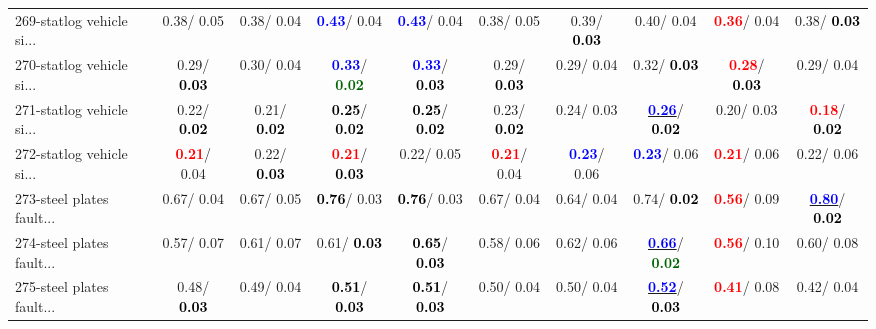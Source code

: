 \begin{table}[h]
\begin{center}
{\begin{tabular}{lc|c|c|c|c|c|c|c|c}
269-statlog vehicle si... &   0.38/  0.05 &   0.38/  0.04 & \textcolor{blue}{\textbf{  0.43}}/  0.04 & \textcolor{blue}{\textbf{  0.43}}/  0.04 &   0.38/  0.05 &   0.39/\textcolor{black}{\textbf{  0.03}} &   0.40/  0.04 & \textcolor{red}{\textbf{  0.36}}/  0.04 &   0.38/\textcolor{black}{\textbf{  0.03}} \\
270-statlog vehicle si... &   0.29/\textcolor{black}{\textbf{  0.03}} &   0.30/  0.04 & \textcolor{blue}{\textbf{  0.33}}/\textcolor{darkgreen}{\textbf{  0.02}} & \textcolor{blue}{\textbf{  0.33}}/\textcolor{black}{\textbf{  0.03}} &   0.29/\textcolor{black}{\textbf{  0.03}} &   0.29/  0.04 &   0.32/\textcolor{black}{\textbf{  0.03}} & \textcolor{red}{\textbf{  0.28}}/\textcolor{black}{\textbf{  0.03}} &   0.29/  0.04 \\ \hline
271-statlog vehicle si... &   0.22/\textcolor{black}{\textbf{  0.02}} &   0.21/\textcolor{black}{\textbf{  0.02}} & \textcolor{black}{\textbf{  0.25}}/\textcolor{black}{\textbf{  0.02}} & \textcolor{black}{\textbf{  0.25}}/\textcolor{black}{\textbf{  0.02}} &   0.23/\textcolor{black}{\textbf{  0.02}} &   0.24/  0.03 & \underline{\textcolor{blue}{\textbf{  0.26}}}/\textcolor{black}{\textbf{  0.02}} &   0.20/  0.03 & \textcolor{red}{\textbf{  0.18}}/\textcolor{black}{\textbf{  0.02}} \\
272-statlog vehicle si... & \textcolor{red}{\textbf{  0.21}}/  0.04 &   0.22/\textcolor{black}{\textbf{  0.03}} & \textcolor{red}{\textbf{  0.21}}/\textcolor{black}{\textbf{  0.03}} &   0.22/  0.05 & \textcolor{red}{\textbf{  0.21}}/  0.04 & \textcolor{blue}{\textbf{  0.23}}/  0.06 & \textcolor{blue}{\textbf{  0.23}}/  0.06 & \textcolor{red}{\textbf{  0.21}}/  0.06 &   0.22/  0.06 \\
273-steel plates fault... &   0.67/  0.04 &   0.67/  0.05 & \textcolor{black}{\textbf{  0.76}}/  0.03 & \textcolor{black}{\textbf{  0.76}}/  0.03 &   0.67/  0.04 &   0.64/  0.04 &   0.74/\textcolor{black}{\textbf{  0.02}} & \textcolor{red}{\textbf{  0.56}}/  0.09 & \underline{\textcolor{blue}{\textbf{  0.80}}}/\textcolor{black}{\textbf{  0.02}} \\
274-steel plates fault... &   0.57/  0.07 &   0.61/  0.07 &   0.61/\textcolor{black}{\textbf{  0.03}} & \textcolor{black}{\textbf{  0.65}}/\textcolor{black}{\textbf{  0.03}} &   0.58/  0.06 &   0.62/  0.06 & \underline{\textcolor{blue}{\textbf{  0.66}}}/\textcolor{darkgreen}{\textbf{  0.02}} & \textcolor{red}{\textbf{  0.56}}/  0.10 &   0.60/  0.08 \\
275-steel plates fault... &   0.48/\textcolor{black}{\textbf{  0.03}} &   0.49/  0.04 & \textcolor{black}{\textbf{  0.51}}/\textcolor{black}{\textbf{  0.03}} & \textcolor{black}{\textbf{  0.51}}/\textcolor{black}{\textbf{  0.03}} &   0.50/  0.04 &   0.50/  0.04 & \underline{\textcolor{blue}{\textbf{  0.52}}}/\textcolor{black}{\textbf{  0.03}} & \textcolor{red}{\textbf{  0.41}}/  0.08 &   0.42/  0.04 \\

\end{tabular}}
\end{center}
\end{table}
